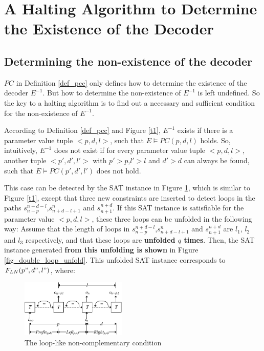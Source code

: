 \documentclass[journal]{IEEEtran}
\begin{document}
\section{A Halting Algorithm to Determine the Existence of the Decoder}\label{sec_exist}
\subsection{Determining the non-existence of the decoder}\label{subsec_deterNo}

$PC$ in Definition \ref{def_pcc} only defines how to determine the existence of the decoder $E^{-1}$.
But how to determine the non-existence of $E^{-1}$ is left undefined.
So the key to a halting algorithm is to find out a necessary and sufficient condition for the non-existence of $E^{-1}$.

According to Definition \ref{def_pcc} and Figure \ref{t1},
$E^{-1}$ exists if there is a parameter value tuple $<p,d,l>$,
such that $E\vDash PC(p,d,l)$ holds.
So,
intuitively,
$E^{-1}$ does not exist if for every parameter value tuple $<p,d,l>$,
another tuple $<p',d',l'>$ with $p'>p$,$l'>l$ and $d'>d$ can always be found,
such that $E\vDash PC(p',d',l')$ does not hold.

This case can be detected by the SAT instance in Figure \ref{fig_double_loop},
which is similar to Figure \ref{t1},
except that three new constraints are inserted to detect loops in the paths $s_{n-p}^{n+d-l}$,$s_{n+d-l+1}^n$ and $s_{n+1}^{n+d}$.
If this SAT instance is satisfiable for the parameter value $<p,d,l>$,
these three loops can be unfolded in the following way:
Assume that the length of loops in $s_{n-p}^{n+d-l}$,$s_{n+d-l+1}^n$ and $s_{n+1}^{n+d}$ are $l_1$, $l_2$ and $l_3$ respectively,
and that these loops are \textbf{unfolded $q$ times}.
Then,
the SAT instance generated \textbf{from this unfolding is shown} in Figure \ref{fig_double_loop_unfold}.
This unfolded SAT instance corresponds to $F_{LN}(p",d",l")$,
where:

\begin{figure}[t]
\begin{center}
\includegraphics[width=0.45\textwidth]{doubleloop}
\end{center}
\caption{The loop-like non-complementary condition}
  \label{fig_double_loop}
\end{figure}
\end{document}
